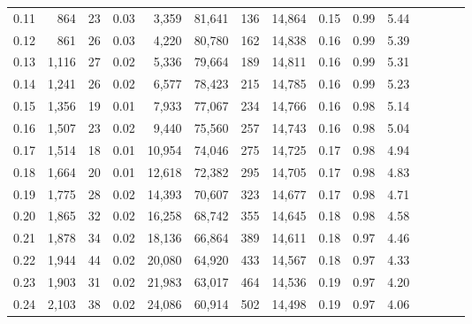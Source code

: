 \begin{tabular}{rrrcrrrrrrrrrrr}
0.11 &    864 &   23 &                                       0.03 &   3,359 &  81,641 &     136 &  14,864 &  0.15 &  0.99 &                         5.44 \\
0.12 &    861 &   26 &                                       0.03 &   4,220 &  80,780 &     162 &  14,838 &  0.16 &  0.99 &                         5.39 \\
0.13 &  1,116 &   27 &                                       0.02 &   5,336 &  79,664 &     189 &  14,811 &  0.16 &  0.99 &                         5.31 \\
0.14 &  1,241 &   26 &                                       0.02 &   6,577 &  78,423 &     215 &  14,785 &  0.16 &  0.99 &                         5.23 \\
0.15 &  1,356 &   19 &                                       0.01 &   7,933 &  77,067 &     234 &  14,766 &  0.16 &  0.98 &                         5.14 \\
0.16 &  1,507 &   23 &                                       0.02 &   9,440 &  75,560 &     257 &  14,743 &  0.16 &  0.98 &                         5.04 \\
0.17 &  1,514 &   18 &                                       0.01 &  10,954 &  74,046 &     275 &  14,725 &  0.17 &  0.98 &                         4.94 \\
0.18 &  1,664 &   20 &                                       0.01 &  12,618 &  72,382 &     295 &  14,705 &  0.17 &  0.98 &                         4.83 \\
0.19 &  1,775 &   28 &                                       0.02 &  14,393 &  70,607 &     323 &  14,677 &  0.17 &  0.98 &                         4.71 \\
0.20 &  1,865 &   32 &                                       0.02 &  16,258 &  68,742 &     355 &  14,645 &  0.18 &  0.98 &                         4.58 \\
0.21 &  1,878 &   34 &                                       0.02 &  18,136 &  66,864 &     389 &  14,611 &  0.18 &  0.97 &                         4.46 \\
0.22 &  1,944 &   44 &                                       0.02 &  20,080 &  64,920 &     433 &  14,567 &  0.18 &  0.97 &                         4.33 \\
0.23 &  1,903 &   31 &                                       0.02 &  21,983 &  63,017 &     464 &  14,536 &  0.19 &  0.97 &                         4.20 \\
0.24 &  2,103 &   38 &                                       0.02 &  24,086 &  60,914 &     502 &  14,498 &  0.19 &  0.97 &                         4.06 \\

\end{tabular}
